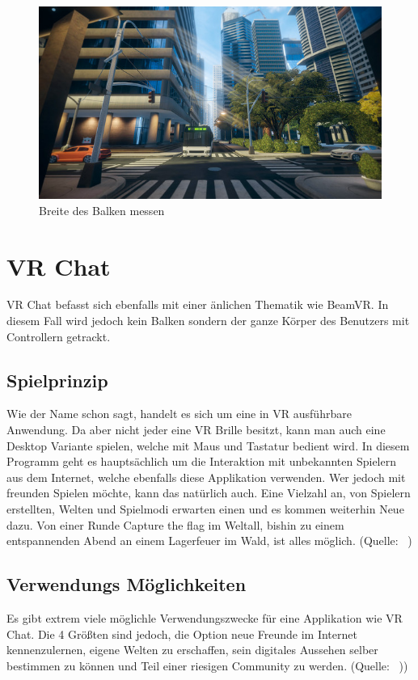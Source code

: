 \begin {figure}
    \includegraphics[scale=0.7]{pics/richiesplankexperience_world}
    \caption{Breite des Balken messen}
    \label{fig:richiesplankexperience_world}
\end {figure}


\section{VR Chat}
\label{sec:vrchat}
VR Chat befasst sich ebenfalls mit einer \"anlichen Thematik wie BeamVR.
In diesem Fall wird jedoch kein Balken sondern der ganze K\"orper des Benutzers mit Controllern getrackt.

\subsection{Spielprinzip}
\label{sec:vrchat_principle}
Wie der Name schon sagt, handelt es sich um eine in VR ausf\"uhrbare Anwendung.
Da aber nicht jeder eine VR Brille besitzt, kann man auch eine Desktop Variante spielen, welche mit Maus und Tastatur bedient wird.
In diesem Programm geht es haupts\"achlich um die Interaktion mit unbekannten Spielern aus dem Internet,
welche ebenfalls diese Applikation verwenden.
Wer jedoch mit freunden Spielen möchte, kann das nat\"urlich auch.
Eine Vielzahl an, von Spielern erstellten, Welten und Spielmodi erwarten einen und es kommen weiterhin Neue dazu.
Von einer Runde Capture the flag im Weltall, bishin zu einem entspannenden Abend an einem Lagerfeuer im Wald, ist alles möglich.
(Quelle: ~\cite{VRChat_2021_Steam})

\subsection{Verwendungs M\"oglichkeiten}
\label{sec:vrchat_usecases}
Es gibt extrem viele m\"oglichle Verwendungszwecke für eine Applikation wie VR Chat.
Die 4 Gr\"oßten sind jedoch, die Option neue Freunde im Internet kennenzulernen, eigene Welten zu erschaffen, sein digitales Aussehen selber bestimmen zu k\"onnen und Teil einer riesigen Community zu werden.
(Quelle: ~\cite{VRChat_2021}))

